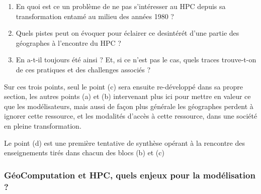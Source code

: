 \begin{enumerate}[label=(\alph*),labelindent=\parindent,leftmargin=*]
\item En quoi est ce un problème de ne pas s'intéresser au HPC depuis sa transformation entamé au milieu des années 1980 ?
\item Quels pistes peut on évoquer pour éclairer ce desintérét d'une partie des géographes à l'encontre du HPC ? 
\item En a-t-il toujours été ainsi ? Et, si ce n'est pas le cas, quels traces trouve-t-on de ces pratiques et des challenges associés ?
\end{enumerate}


Sur ces trois points, seul le point (c) sera ensuite re-développé dans sa propre section, les autres points (a) et (b) intervenant plus ici pour mettre en valeur ce que les modélisateurs, mais aussi de façon plus générale les géographes perdent à ignorer cette ressource, et les modalités d'accès à cette ressource, dans une société en pleine transformation. 

Le point (d) est une première tentative de synthèse opérant à la rencontre des enseignements tirés dans chacun des blocs (b) et (c)


\subsubsection{GéoComputation et HPC, quels enjeux pour la modélisation ? }
\label{sssec:enjeuxHPC}

